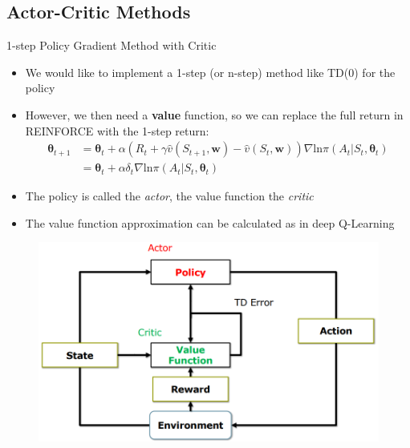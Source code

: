 \subsection{Actor-Critic Methods}
1-step Policy Gradient Method with Critic
\begin{itemize}
    \item We would like to implement a 1-step (or n-step) method like TD(0) for the policy
    \item However, we then need a \textbf{value} function, so we can replace the full return in REINFORCE with the 1-step return:
    \begin{align*}
        \boldsymbol{\theta}_{t+1} &= \boldsymbol{\theta}_t + \alpha(R_t + \gamma\hat{v}(S_{t+1},\boldsymbol{w})-\hat{v}(S_t,\boldsymbol{w}))\nabla \text{ln}\pi(A_t|S_t,\boldsymbol{\theta}_t)\\
        &= \boldsymbol{\theta}_t + \alpha\delta_t\nabla \text{ln}\pi(A_t|S_t,\boldsymbol{\theta}_t)
    \end{align*}
    \item The policy is called the \textit{actor}, the value function the \textit{critic}
    \item The value function approximation can be calculated as in deep Q-Learning
\end{itemize}
\begin{figure}[!h]
    \centering
    \includegraphics[width = \columnwidth]{figures/DeepReinforcementLearning2/ActorCritic.png}
\end{figure}

